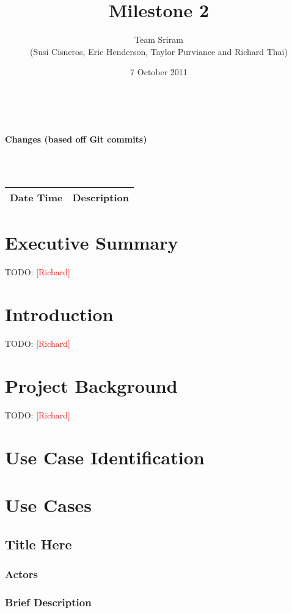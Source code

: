 \documentclass{article}
\newcommand{\richard}{\textcolor{red}{[Richard]}}
\begin{document}
\setlength{\voffset}{3.5in}
\title{Milestone 2}
\author{Team Sriram\\
(Susi Cisneros, Eric Henderson, Taylor Purviance and Richard Thai)}
\date{7 October 2011}
\maketitle
\clearpage
\setlength{\voffset}{0pt}
\tableofcontents
\clearpage
~\\
\begin{Large}\textbf{Changes (based off Git commits)}\end{Large}\\
~\\
\begin{tabular}{ | p{2in} | p{4.5in} | }
\hline
\textbf{Date Time} & \textbf{Description}\\
\hline
\hline
\end{tabular}

\section{Executive Summary}
TODO: \richard

\section{Introduction}
TODO: \richard

\section{Project Background}
TODO: \richard

\section{Use Case Identification}

\section{Use Cases}
\subsection{Title Here}

\subsubsection{Actors}

\subsubsection{Brief Description}
\end{document}
